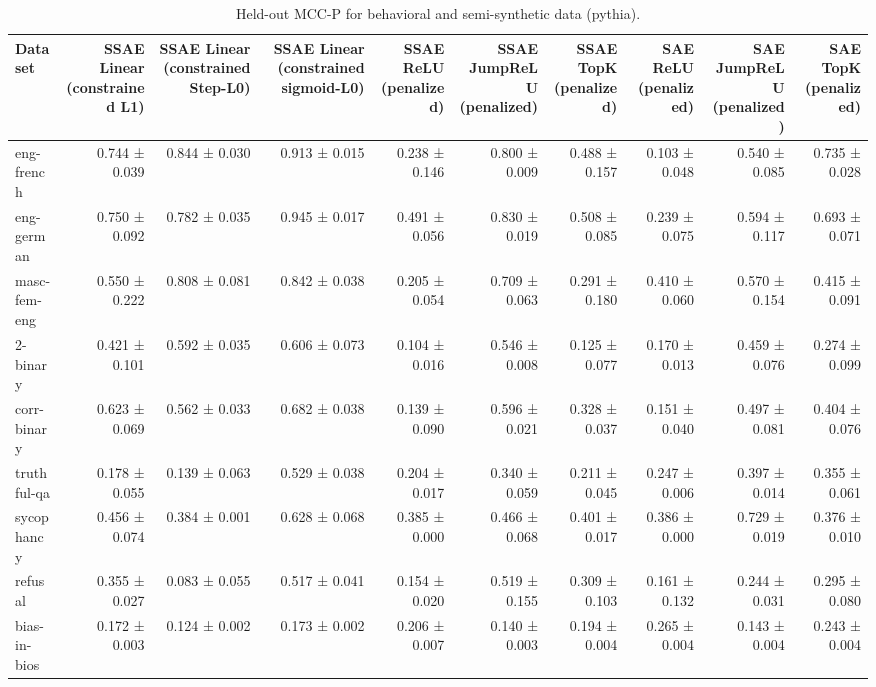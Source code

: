 \begin{table}[t]
\centering
\caption{Held-out MCC-P for behavioral and semi-synthetic data (pythia).}
\label{tab:all-datasets-pythia-mcc-p}
\begin{tabular}{lrrrrrrrrr}
\toprule
Dataset & SSAE Linear (constrained L1) & SSAE Linear (constrained Step-L0) & SSAE Linear (constrained sigmoid-L0) & SSAE ReLU (penalized) & SSAE JumpReLU (penalized) & SSAE TopK (penalized) & SAE ReLU (penalized) & SAE JumpReLU (penalized) & SAE TopK (penalized) \\
\midrule
eng-french & 0.744 ± 0.039 & 0.844 ± 0.030 & 0.913 ± 0.015 & 0.238 ± 0.146 & 0.800 ± 0.009 & 0.488 ± 0.157 & 0.103 ± 0.048 & 0.540 ± 0.085 & 0.735 ± 0.028 \\
eng-german & 0.750 ± 0.092 & 0.782 ± 0.035 & 0.945 ± 0.017 & 0.491 ± 0.056 & 0.830 ± 0.019 & 0.508 ± 0.085 & 0.239 ± 0.075 & 0.594 ± 0.117 & 0.693 ± 0.071 \\
masc-fem-eng & 0.550 ± 0.222 & 0.808 ± 0.081 & 0.842 ± 0.038 & 0.205 ± 0.054 & 0.709 ± 0.063 & 0.291 ± 0.180 & 0.410 ± 0.060 & 0.570 ± 0.154 & 0.415 ± 0.091 \\
2-binary & 0.421 ± 0.101 & 0.592 ± 0.035 & 0.606 ± 0.073 & 0.104 ± 0.016 & 0.546 ± 0.008 & 0.125 ± 0.077 & 0.170 ± 0.013 & 0.459 ± 0.076 & 0.274 ± 0.099 \\
corr-binary & 0.623 ± 0.069 & 0.562 ± 0.033 & 0.682 ± 0.038 & 0.139 ± 0.090 & 0.596 ± 0.021 & 0.328 ± 0.037 & 0.151 ± 0.040 & 0.497 ± 0.081 & 0.404 ± 0.076 \\
truthful-qa & 0.178 ± 0.055 & 0.139 ± 0.063 & 0.529 ± 0.038 & 0.204 ± 0.017 & 0.340 ± 0.059 & 0.211 ± 0.045 & 0.247 ± 0.006 & 0.397 ± 0.014 & 0.355 ± 0.061 \\
sycophancy & 0.456 ± 0.074 & 0.384 ± 0.001 & 0.628 ± 0.068 & 0.385 ± 0.000 & 0.466 ± 0.068 & 0.401 ± 0.017 & 0.386 ± 0.000 & 0.729 ± 0.019 & 0.376 ± 0.010 \\
refusal & 0.355 ± 0.027 & 0.083 ± 0.055 & 0.517 ± 0.041 & 0.154 ± 0.020 & 0.519 ± 0.155 & 0.309 ± 0.103 & 0.161 ± 0.132 & 0.244 ± 0.031 & 0.295 ± 0.080 \\
bias-in-bios & 0.172 ± 0.003 & 0.124 ± 0.002 & 0.173 ± 0.002 & 0.206 ± 0.007 & 0.140 ± 0.003 & 0.194 ± 0.004 & 0.265 ± 0.004 & 0.143 ± 0.004 & 0.243 ± 0.004 \\
\bottomrule
\end{tabular}
\end{table}
